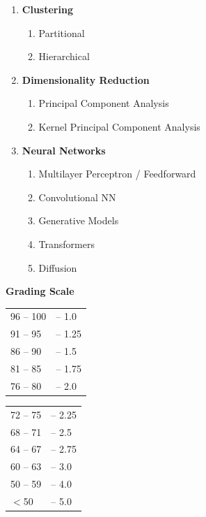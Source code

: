 \documentclass[a4paper,10pt]{article}
\begin{document}
\begin{enumerate}[label=\Roman*.]
    \item \textbf{Clustering}
    \begin{enumerate}[label=\alph*.]
        \item Partitional
        \item Hierarchical
    \end{enumerate}

    \item \textbf{Dimensionality Reduction}
    \begin{enumerate}[label=\alph*.]
        \item Principal Component Analysis
        \item Kernel Principal Component Analysis
    \end{enumerate}

    \item \textbf{Neural Networks}
    \begin{enumerate}[label=\alph*.]
        \item Multilayer Perceptron / Feedforward
        \item Convolutional NN
        \item Generative Models
        \item Transformers
        \item Diffusion
    \end{enumerate}
\end{enumerate}

\vspace{1.5em}

\newpage

\noindent \textbf{Grading Scale}
\begin{multicols}{2}
\noindent
    \begin{tabular}{ll}
        96 -- 100 & -- 1.0 \\
        91 -- 95  & -- 1.25 \\
        86 -- 90  & -- 1.5 \\
        81 -- 85  & -- 1.75 \\
        76 -- 80  & -- 2.0 \\
    \end{tabular}
    
    \columnbreak
    
    \begin{tabular}{ll}
        72 -- 75  & -- 2.25 \\
        68 -- 71  & -- 2.5 \\
        64 -- 67  & -- 2.75 \\
        60 -- 63  & -- 3.0 \\
        50 -- 59  & -- 4.0 \\
        $<$50        & -- 5.0 \\
    \end{tabular}
\end{multicols}
\end{document}
